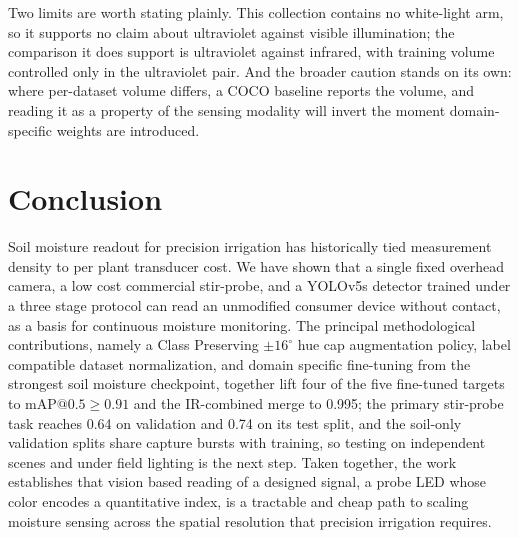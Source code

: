 ﻿\documentclass[journal]{IEEEtran}
\begin{document}
Two limits are worth stating plainly. This collection contains no white-light arm, so it supports no claim about ultraviolet against visible illumination; the comparison it does support is ultraviolet against infrared, with training volume controlled only in the ultraviolet pair. And the broader caution stands on its own: where per-dataset volume differs, a COCO baseline reports the volume, and reading it as a property of the sensing modality will invert the moment domain-specific weights are introduced.

\section{Conclusion}
\label{sec:conclusion}
Soil moisture readout for precision irrigation has historically tied measurement density to per plant transducer cost. We have shown that a single fixed overhead camera, a low cost commercial stir-probe, and a YOLOv5s detector trained under a three stage protocol can read an unmodified consumer device without contact, as a basis for continuous moisture monitoring. The principal methodological contributions, namely a Class Preserving $\pm 16^{\circ}$ hue cap augmentation policy, label compatible dataset normalization, and domain specific fine-tuning from the strongest soil moisture checkpoint, together lift four of the five fine-tuned targets to $\text{mAP@0.5} \geq 0.91$ and the IR-combined merge to 0.995; the primary stir-probe task reaches 0.64 on validation and 0.74 on its test split, and the soil-only validation splits share capture bursts with training, so testing on independent scenes and under field lighting is the next step. Taken together, the work establishes that vision based reading of a designed signal, a probe LED whose color encodes a quantitative index, is a tractable and cheap path to scaling moisture sensing across the spatial resolution that precision irrigation requires.



\end{document}
